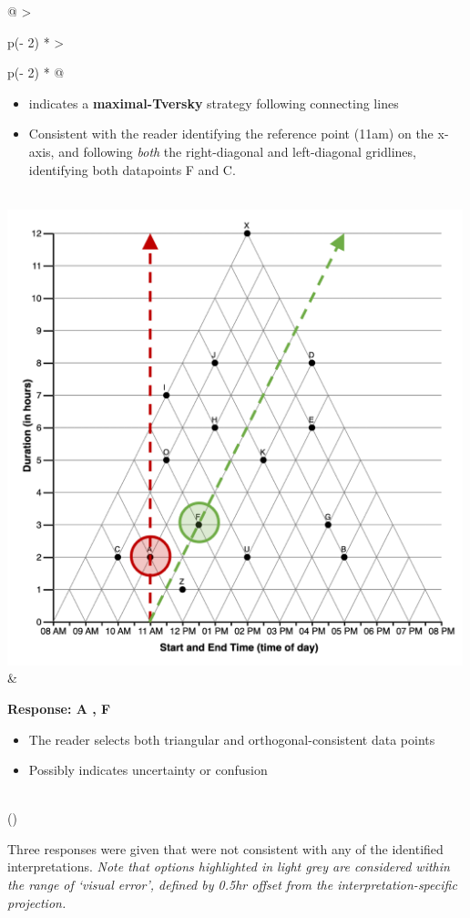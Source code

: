 \documentclass[
  letterpaper,
  DIV=11,
  numbers=noendperiod]{scrreprt}
\begin{document}
\begin{longtable}[]{@{}
  >{\raggedright\arraybackslash}p{(\columnwidth - 2\tabcolsep) * }
  >{\raggedright\arraybackslash}p{(\columnwidth - 2\tabcolsep) * }@{}}
\begin{minipage}[t]{\linewidth}
\begin{itemize}
\item
  indicates a \textbf{maximal-Tversky} strategy following connecting
  lines
\item
  Consistent with the reader identifying the reference point (11am) on
  the x-axis, and following \emph{both} the right-diagonal and
  left-diagonal gridlines, identifying both datapoints F and C.
\end{itemize}
\end{minipage} \\
\includegraphics[width=5.20833in,height=\textheight]{analysis/SGC3A/static/interpretations/Q1_111_AF.png}
& \begin{minipage}[t]{\linewidth}\raggedright
\textbf{Response: A , F}

\begin{itemize}
\item
  The reader selects both triangular and orthogonal-consistent data
  points
\item
  Possibly indicates uncertainty or confusion
\end{itemize}
\end{minipage} \\
\bottomrule()
\end{longtable}

Three responses were given that were not consistent with any of the
identified interpretations. \emph{Note that options highlighted in light
grey are considered within the range of `visual error', defined by 0.5hr
offset from the interpretation-specific projection.}
\end{document}
